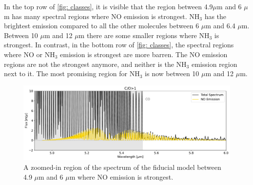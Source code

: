 \documentclass[twoside, single, authoryear, semicolon, 12pt]{lion-msc}
\newcommand{\4}{$_4$}
\newcommand{\3}{$_3$}
\newcommand{\2}{$_2$}
\begin{document}
In the top row of \autoref{fig: classes}, it is visible that the region between 4.9$\mu$m and 6 $\mu$m has many spectral regions where NO emission is strongest. NH\3 has the brightest emission compared to all the other molecules between 6 $\mu$m and 6.4 $\mu$m. Between 10 $\mu$m and 12 $\mu$m there are some smaller regions where NH\3 is strongest. In contrast, in the bottom row of \autoref{fig: classes}, the spectral regions where NO or NH\3 emission is strongest are more barren. The NO emission regions are not the strongest anymore, and neither is the NH\3 emission region next to it. The most promising region for NH\3 is now between 10 $\mu$m and 12 $\mu$m. 

\begin{figure}[!ht]
    \centering
    \includegraphics[width=\linewidth]{Figures/NO_region.pdf}
    \caption{A zoomed-in region of the spectrum of the fiducial model between 4.9 $\mu$m and 6 $\mu$m where NO emission is strongest.}
    \label{fig: NO region}
\end{figure}
\end{document}
